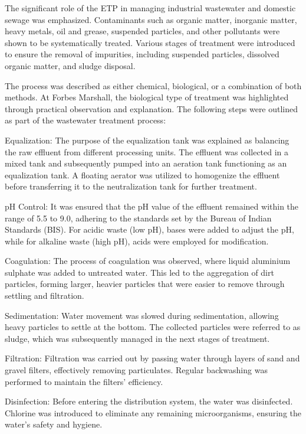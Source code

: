 The significant role of the ETP in managing industrial wastewater and domestic sewage was emphasized. Contaminants such as organic matter, inorganic matter, heavy metals, oil and grease, suspended particles, and other pollutants were shown to be systematically treated. Various stages of treatment were introduced to ensure the removal of impurities, including suspended particles, dissolved organic matter, and sludge disposal.

The process was described as either chemical, biological, or a combination of both methods. At Forbes Marshall, the biological type of treatment was highlighted through practical observation and explanation. The following steps were outlined as part of the wastewater treatment process:

Equalization:
The purpose of the equalization tank was explained as balancing the raw effluent from different processing units. The effluent was collected in a mixed tank and subsequently pumped into an aeration tank functioning as an equalization tank. A floating aerator was utilized to homogenize the effluent before transferring it to the neutralization tank for further treatment.

pH Control:
It was ensured that the pH value of the effluent remained within the range of 5.5 to 9.0, adhering to the standards set by the Bureau of Indian Standards (BIS). For acidic waste (low pH), bases were added to adjust the pH, while for alkaline waste (high pH), acids were employed for modification.

Coagulation:
The process of coagulation was observed, where liquid aluminium sulphate was added to untreated water. This led to the aggregation of dirt particles, forming larger, heavier particles that were easier to remove through settling and filtration.

Sedimentation:
Water movement was slowed during sedimentation, allowing heavy particles to settle at the bottom. The collected particles were referred to as sludge, which was subsequently managed in the next stages of treatment.

Filtration:
Filtration was carried out by passing water through layers of sand and gravel filters, effectively removing particulates. Regular backwashing was performed to maintain the filters’ efficiency.

Disinfection:
Before entering the distribution system, the water was disinfected. Chlorine was introduced to eliminate any remaining microorganisms, ensuring the water's safety and hygiene.

